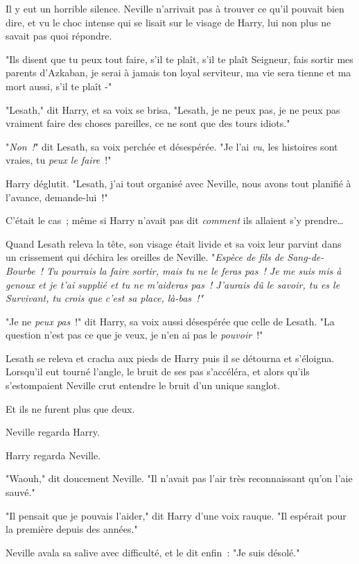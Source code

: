 Il y eut un horrible silence. Neville n'arrivait pas à trouver ce qu'il pouvait bien dire, et vu le choc intense qui se lisait sur le visage de Harry, lui non plus ne savait pas quoi répondre.

"Ils disent que tu peux tout faire, s'il te plaît, s'il te plaît Seigneur, fais sortir mes parents d'Azkaban, je serai à jamais ton loyal serviteur, ma vie sera tienne et ma mort aussi, s'il te plaît -"

"Lesath," dit Harry, et sa voix se brisa, "Lesath, je ne peux pas, je ne peux pas vraiment faire des choses pareilles, ce ne sont que des tours idiots."

"\emph{Non~!}" dit Lesath, sa voix perchée et désespérée. "Je l'ai \emph{vu}, les histoires sont vraies, tu \emph{peux le faire}~!"

Harry déglutit. "Lesath, j'ai tout organisé avec Neville, nous avons tout planifié à l'avance, demande-lui~!"

C'était le cas~; même si Harry n'avait pas dit \emph{comment} ils allaient s'y prendre…

Quand Lesath releva la tête, son visage était livide et sa voix leur parvint dans un crissement qui déchira les oreilles de Neville. "\emph{Espèce de fils de Sang-de-Bourbe~! Tu pourrais la faire sortir, mais tu ne le feras pas~! Je me suis mis à genoux et je t'ai supplié et tu ne m'aideras pas~! J'aurais dû le savoir, tu es le Survivant, tu crois que c'est sa place, là-bas~!"}

"Je ne \emph{peux pas}~!" dit Harry, sa voix aussi désespérée que celle de Lesath. "La question n'est pas ce que je veux, je n'en ai pas le \emph{pouvoir}~!"

Lesath se releva et cracha aux pieds de Harry puis il se détourna et s'éloigna. Lorsqu'il eut tourné l'angle, le bruit de ses pas s'accéléra, et alors qu'ils s'estompaient Neville crut entendre le bruit d'un unique sanglot.

Et ils ne furent plus que deux.

Neville regarda Harry.

Harry regarda Neville.

"Waouh," dit doucement Neville. "Il n'avait pas l'air très reconnaissant qu'on l'aie sauvé."

"Il pensait que je pouvais l'aider," dit Harry d'une voix rauque. "Il espérait pour la première depuis des années."

Neville avala sa salive avec difficulté, et le dit enfin~: "Je suis désolé."

